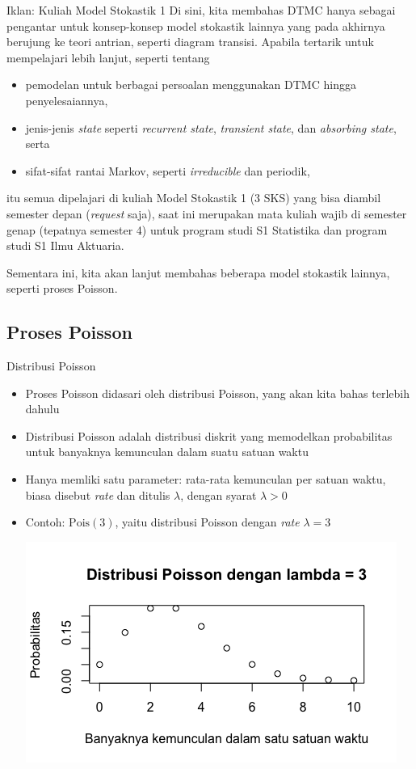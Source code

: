 \documentclass{beamer}
\begin{document}
\begin{frame}{Iklan: Kuliah Model Stokastik 1}
Di sini, kita membahas DTMC hanya sebagai pengantar untuk konsep-konsep model stokastik lainnya yang pada akhirnya berujung ke teori antrian, seperti diagram transisi. Apabila tertarik untuk mempelajari lebih lanjut, seperti tentang
\begin{itemize}
    \item pemodelan untuk berbagai persoalan menggunakan DTMC hingga penyelesaiannya,
    \item jenis-jenis \textit{state} seperti \textit{recurrent state}, \textit{transient state}, dan \textit{absorbing state}, serta
    \item sifat-sifat rantai Markov, seperti \textit{irreducible} dan periodik,
\end{itemize}
itu semua dipelajari di kuliah Model Stokastik 1 (3 SKS) yang bisa diambil semester depan (\textit{request} saja), saat ini merupakan mata kuliah wajib di semester genap (tepatnya semester 4) untuk program studi S1 Statistika dan program studi S1 Ilmu Aktuaria.

Sementara ini, kita akan lanjut membahas beberapa model stokastik lainnya, seperti proses Poisson.
\end{frame}

\subsection{Proses Poisson}

\begin{frame}{Distribusi Poisson}
    \begin{itemize}
        \item Proses Poisson didasari oleh distribusi Poisson, yang akan kita bahas terlebih dahulu
        \item Distribusi Poisson adalah distribusi diskrit yang memodelkan probabilitas untuk banyaknya kemunculan dalam suatu satuan waktu
        \item Hanya memliki satu parameter: rata-rata kemunculan per satuan waktu, biasa disebut \textit{rate} dan ditulis \( \lambda \), dengan syarat \( \lambda > 0 \)
        \item Contoh: \( \text{Pois}(3) \), yaitu distribusi Poisson dengan \textit{rate} \( \lambda = 3 \)

        \includegraphics[scale=0.45]{gambar/dist_pois_lambda3.png}
    \end{itemize}
\end{frame}
\end{document}
